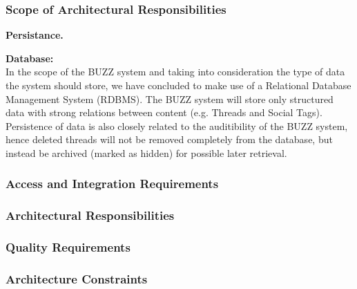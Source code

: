 
\subsubsection{Scope of Architectural Responsibilities}
\begin{flushleft}
	\textbf{Persistance.}
	\begin{flushleft}
	\textbf{Database: } \\
	In the scope of the BUZZ system and taking into consideration the type of data the system should store, we have concluded to make use of a Relational Database Management System (RDBMS). The BUZZ system will store only structured data with strong relations between content (e.g. Threads and Social Tags). Persistence of data is also closely related to the auditibility of the BUZZ system, hence deleted threads will not be removed completely from the database, but instead be archived (marked as hidden) for possible later retrieval.
	\end{flushleft}
\end{flushleft}

\subsubsection{Access and Integration Requirements}
\subsubsection{Architectural Responsibilities}
\subsubsection{Quality Requirements}
	
	
\subsubsection{Architecture Constraints}